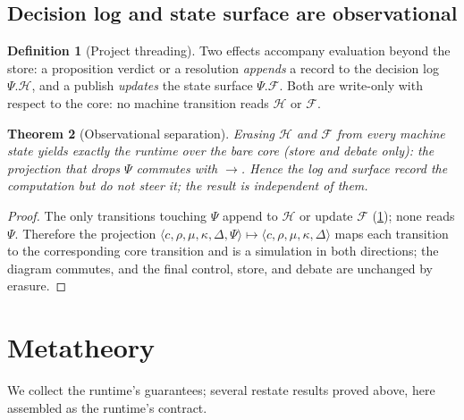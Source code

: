 \documentclass[11pt,a4paper]{article}
\theoremstyle{plain}
\newtheorem{theorem}{Theorem}[section]
\theoremstyle{definition}
\newtheorem{definition}[theorem]{Definition}
\theoremstyle{remark}
\newcommand{\env}{\rho}
\newcommand{\store}{\mu}
\newcommand{\cont}{\kappa}
\newcommand{\dbt}{\Delta}
\newcommand{\sys}{\Psi}
\newcommand{\stepm}{\longrightarrow}       %
\begin{document}
\subsection{Decision log and state surface are observational}

\begin{definition}[Project threading]
\label{def:threading}
Two effects accompany evaluation beyond the store: a proposition verdict or a
resolution \emph{appends} a record to the decision log $\sys.\mathcal H$, and a
publish \emph{updates} the state surface $\sys.\mathcal F$. Both are write-only
with respect to the core: no machine transition reads $\mathcal H$ or
$\mathcal F$.
\end{definition}

\begin{theorem}[Observational separation]
\label{thm:observational}
Erasing $\mathcal H$ and $\mathcal F$ from every machine state yields exactly the
runtime over the bare core (store and debate only): the projection that drops
$\sys$ commutes with $\stepm$. Hence the log and surface record the computation
but do not steer it; the result is independent of them.
\end{theorem}
\begin{proof}
The only transitions touching $\sys$ append to $\mathcal H$ or update
$\mathcal F$ (\cref{def:threading}); none reads $\sys$. Therefore the projection
$\langle c,\env,\store,\cont,\dbt,\sys\rangle\mapsto\langle c,\env,\store,\cont,
\dbt\rangle$ maps each transition to the corresponding core transition and is a
simulation in both directions; the diagram commutes, and the final control,
store, and debate are unchanged by erasure.
\end{proof}

\section{Metatheory}
\label{sec:meta}

We collect the runtime's guarantees; several restate results proved above, here
assembled as the runtime's contract.
\end{document}
